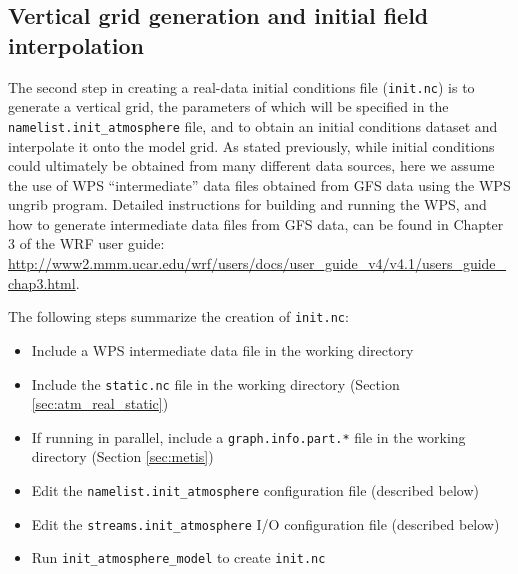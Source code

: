 \subsection{Vertical grid generation and initial field interpolation}
\label{sec:atm_real_met}

The second step in creating a real-data initial conditions file ({\tt init.nc}) is to generate a vertical grid, the parameters of which will be specified in the {\tt namelist.init\_atmosphere} file, and to obtain an initial conditions dataset and interpolate it onto the model grid. As stated previously, while initial conditions could ultimately be obtained from many different data sources, here we assume the use of WPS ``intermediate'' data files obtained from GFS data using the WPS ungrib program.  Detailed instructions for building and running the WPS, and how to generate intermediate data files from GFS data, can be found in Chapter 3 of the WRF user guide: \\
\url{http://www2.mmm.ucar.edu/wrf/users/docs/user_guide_v4/v4.1/users_guide_chap3.html}.

The following steps summarize the creation of {\tt init.nc}:

\begin{itemize}
\item Include a WPS intermediate data file in the working directory
\item Include the {\tt static.nc} file in the working directory (Section \ref{sec:atm_real_static})
\item If running in parallel, include a {\tt graph.info.part.*} file in the working directory (Section \ref{sec:metis})
\item Edit the {\tt namelist.init\_atmosphere} configuration file (described below)
\item Edit the {\tt streams.init\_atmosphere} I/O configuration file (described below)
\item Run {\tt init\_atmosphere\_model} to create {\tt init.nc}
\end{itemize}


